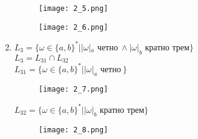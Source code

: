 \documentclass[12pt, a4paper]{article}
\begin{document}
\begin{enumerate}
    \begin{figure}[H]
        \centering
        \texttt{[image: 2\_5.png]}
    \end{figure}

\begin{comment}
digraph {
    rankdir="LR"
    "" [shape=point]
    q1q5 [shape=circle]
    q2q6 [shape=circle]
    q3q5 [shape=circle]
    q4q6 [shape=doublecircle]
    q4q5 [shape=circle]
    
    "" -> q1q5
    q1q5 -> q2q6 [label="a,b"]
    q2q6 -> q3q5 [label="a,b"]
    q3q5 -> q4q6 [label="a,b"]
    q4q5 -> q4q6 [label="a,b"]
    q4q6 -> q4q5 [label="a,b"]
}
\end{comment}

    \begin{figure}[H]
        \centering
        \texttt{[image: 2\_6.png]}
    \end{figure}
    \item \(L_3=\{\omega\in\{a,b\}^* | |\omega|_a \text{ четно}\ \wedge |\omega|_b \text{ кратно трем} \} \)
\\\(L_3=L_{31} \cap L_{32}\)
\\\(L_{31}=\{\omega\in\{a,b\}^* | |\omega|_a \text{ четно}\ \} \)

\begin{comment}
digraph {
    rankdir="LR"
    "" [shape=point]
    q1 [shape=doublecircle]
    q2 [shape=circle]
    
    "" -> q1
    q1 -> q1 [label="b"]
    q1 -> q2 [label="a"]
    q2 -> q2 [label="b"]
    q2 -> q1 [label="a"]
}
\end{comment}

    \begin{figure}[H]
        \centering
        \texttt{[image: 2\_7.png]}
    \end{figure}

\(L_{32}=\{\omega\in\{a,b\}^* | |\omega|_b \text{ кратно трем} \} \)
\begin{comment}
digraph {
    rankdir="LR"
    "" [shape=point]
    q3 [shape=doublecircle]
    q4 [shape=circle]
    q5 [shape=circle]
    
    "" -> q3
    q3 -> q3 [label="a"]
    q3 -> q4 [label="b"]
    q4 -> q4 [label="a"]
    q4 -> q5 [label="b"]
    q5 -> q5 [label="a"]
    q5 -> q3 [label="b"]
}
\end{comment}

    \begin{figure}[H]
        \centering
        \texttt{[image: 2\_8.png]}
    \end{figure}


\end{enumerate}
\end{document}
